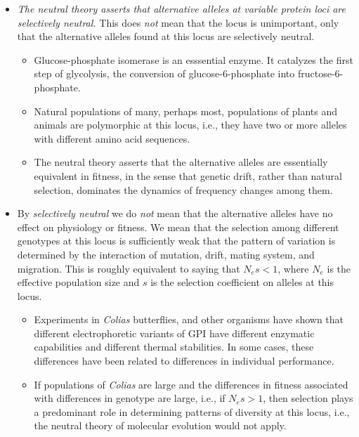 \documentclass[12pt]{article}
\begin{document}
\begin{itemize}

\item {\it The neutral theory asserts that alternative alleles at
    variable protein loci are selectively neutral.} This does {\it
    not\/} mean that the locus is unimportant, only that the
  alternative alleles found at this locus are selectively
  neutral.

\begin{itemize}

\item Glucose-phosphate isomerase is an esssential enzyme. It
  catalyzes the first step of glycolysis, the conversion of
  glucose-6-phosphate into fructose-6-phosphate.

\item Natural populations of many, perhaps most, populations of plants
  and animals are polymorphic at this locus, i.e., they have two or
  more alleles with different amino acid sequences.

\item The neutral theory asserts that the alternative alleles are
  essentially equivalent in fitness, in the sense that genetic drift,
  rather than natural selection, dominates the dynamics of frequency
  changes among them.

\end{itemize}

\item By {\it selectively neutral\/} we do {\it not\/} mean that the
  alternative alleles have no effect on physiology or fitness. We mean
  that the selection among different genotypes at this locus is
  sufficiently weak that the pattern of variation is determined by the
  interaction of mutation, drift, mating system, and migration. This
  is roughly equivalent to saying that $N_es < 1$, where $N_e$ is the
  effective population size and $s$ is the selection coefficient on
  alleles at this locus.

\begin{itemize}

\item Experiments in {\it Colias\/} butterflies, and other organisms
  have shown that different electrophoretic variants of GPI have
  different enzymatic capabilities and different thermal
  stabilities. In some cases, these differences have been related to
  differences in individual performance.

\item If populations of {\it Colias\/} are large and the differences
  in fitness associated with differences in genotype are large, i.e.,
  if $N_es > 1$, then selection plays a predominant role in
  determining patterns of diversity at this locus, i.e., the neutral
  theory of molecular evolution would not apply.


\end{itemize}
\end{itemize}
\end{document}
